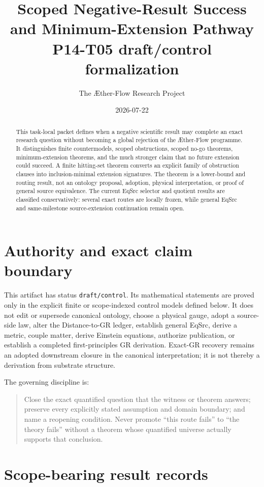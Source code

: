 \documentclass[11pt]{article}
\title{Scoped Negative-Result Success and Minimum-Extension Pathway\\
\large P14-T05 draft/control formalization}
\author{The \AE ther-Flow Research Project}
\date{2026-07-22}
\begin{document}
\maketitle

\begin{abstract}
This task-local packet defines when a negative scientific result may complete
an exact research question without becoming a global rejection of the
\AE ther-Flow programme.  It distinguishes finite countermodels, scoped
obstructions, scoped no-go theorems, minimum-extension theorems, and the much
stronger claim that no future extension could succeed.  A finite hitting-set
theorem converts an explicit family of obstruction clauses into
inclusion-minimal extension signatures.  The theorem is a lower-bound and
routing result, not an ontology proposal, adoption, physical interpretation,
or proof of general source equivalence.  The current EqSrc selector and
quotient results are classified conservatively: several exact routes are
locally frozen, while general EqSrc and same-milestone source-extension
continuation remain open.
\end{abstract}

\section{Authority and exact claim boundary}

This artifact has status \texttt{draft/control}.  Its mathematical statements
are proved only in the explicit finite or scope-indexed control models defined
below.  It does not edit or supersede canonical ontology, choose a physical
gauge, adopt a source-side law, alter the Distance-to-GR ledger, establish
general EqSrc, derive a metric, couple matter, derive Einstein equations,
authorize publication, or establish a completed first-principles GR
derivation.  Exact-GR recovery remains an adopted downstream closure in the
canonical interpretation; it is not thereby a derivation from substrate
structure.

The governing discipline is:
\begin{quote}
Close the exact quantified question that the witness or theorem answers;
preserve every explicitly stated assumption and domain boundary; and name a
reopening condition.  Never promote ``this route fails'' to ``the theory
fails'' without a theorem whose quantified universe actually supports that
conclusion.
\end{quote}

\section{Scope-bearing result records}
\end{document}
